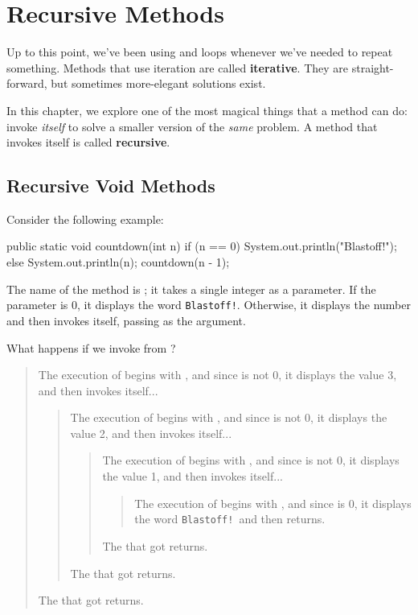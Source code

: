 \chapter{Recursive Methods}


Up to this point, we've been using  and  loops whenever we've needed to repeat something.
Methods that use iteration are called {\bf iterative}.
They are straight-forward, but sometimes more-elegant solutions exist.

In this chapter, we explore one of the most magical things that a method can do: invoke {\em itself} to solve a smaller version of the {\em same} problem.
A method that invokes itself is called {\bf recursive}.


\section{Recursive Void Methods}
\label{recursion}


Consider the following example:

\begin{code}
public static void countdown(int n) {
    if (n == 0) {
        System.out.println("Blastoff!");
    } else {
        System.out.println(n);
        countdown(n - 1);
    }
}
\end{code}

The name of the method is ; it takes a single integer as a parameter.
If the parameter is 0, it displays the word {\tt Blastoff!}.
Otherwise, it displays the number and then invokes itself, passing  as the argument.

What happens if we invoke  from ?

\vspace{-1ex}
\begin{quote}
The execution of  begins with , and since  is not 0, it displays the value 3, and then invokes itself...
\begin{quote}
The execution of  begins with , and since  is not 0, it displays the value 2, and then invokes itself...
\begin{quote}
The execution of  begins with , and since  is not 0, it displays the value 1, and then invokes itself...
\begin{quote}
The execution of  begins with , and since  is 0, it displays the word {\tt Blastoff!}\ and then returns.
\end{quote}
The  that got  returns.
\end{quote}
The  that got  returns.
\end{quote}
The  that got  returns.
\end{quote}
\vspace{-1ex}

